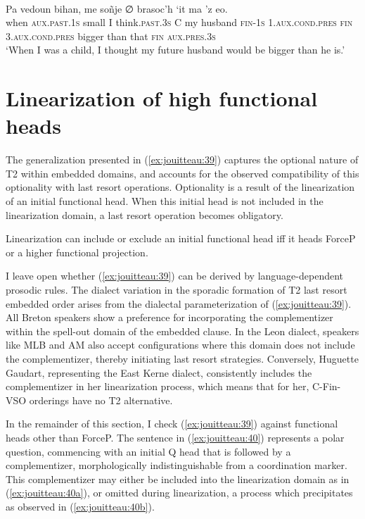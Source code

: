 \documentclass[output=paper,colorlinks,citecolor=brown]{langscibook}
\begin{document}
\ea \label{ex:jouitteau:38} \\
\gll Pa vedoun bihan, me soñje ∅     {} {} brasoc’h  ‘it     ma  ’z   eo.\\
when  \textsc{aux.past.1s} small I     think\textsc{.past.3s} C my husband \textsc{fin-1s} \textsc{1.aux.cond.pres} \textsc{fin} \textsc{3.aux}.\textsc{cond.pres} bigger than that \textsc{fin} \textsc{aux.pres.3s}\\
\glt ‘When I was a child, I thought my future husband would be bigger than he is.’
\z 
{}

\section{Linearization of high functional heads}\label{sec:jouitteau:5}

The generalization presented in (\ref{ex:jouitteau:39}) captures the optional nature of T2 within embedded domains, and accounts for the observed compatibility of this optionality with last resort operations. Optionality is a result of the linearization of an initial functional head. When this initial head is not included in the linearization domain, a last resort operation becomes obligatory.  

\ea \label{ex:jouitteau:39} Linearization can include or exclude an initial functional head iff it heads ForceP or a higher   functional projection. 
\z 

I leave open whether (\ref{ex:jouitteau:39}) can be derived by language-dependent prosodic rules. The dialect variation in the sporadic formation of T2 last resort embedded order arises from the dialectal parameterization of (\ref{ex:jouitteau:39}). All Breton speakers show a preference for incorporating the complementizer within the spell-out domain of the embedded clause. In the Leon dialect, speakers like MLB and AM also accept configurations where this domain does not include the complementizer, thereby initiating last resort strategies. Conversely, Huguette Gaudart, representing the East Kerne dialect, consistently includes the complementizer in her linearization process, which means that for her, C-Fin-VSO orderings have no T2 alternative. 

In the remainder of this section, I check (\ref{ex:jouitteau:39}) against functional heads other than ForceP. The sentence in (\ref{ex:jouitteau:40}) represents a polar question, commencing with an initial Q head that is followed by a complementizer, morphologically indistinguishable from a coordination marker. This complementizer may either be included into the linearization domain as in (\ref{ex:jouitteau:40a}), or omitted during linearization, a process which precipitates  as observed in (\ref{ex:jouitteau:40b}). 
\end{document}
